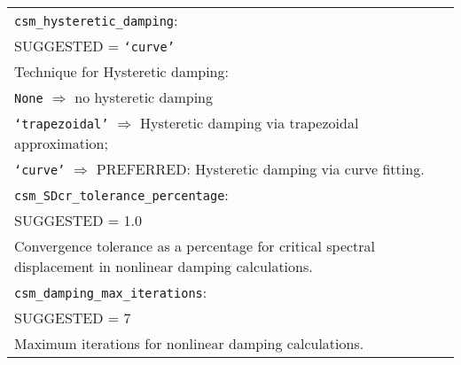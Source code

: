 \documentclass[a4paper, 12pt]{report}
\begin{document}
\begin{tabular}{|p{\textwidth}|}
\hline \vspace{0.1em} \texttt{csm\_hysteretic\_damping}: \\
SUGGESTED = \texttt{`curve'} \\
Technique for Hysteretic  damping: \\
 \hspace{0.5em} \texttt{None} $\Rightarrow$ no hysteretic  damping \\
 \hspace{0.5em} \texttt{`trapezoidal'} $\Rightarrow$ Hysteretic  damping via trapezoidal approximation; \\
 \hspace{0.5em} \texttt{`curve'} $\Rightarrow$ \small{PREFERRED}: Hysteretic  damping via curve fitting. \\
\hline \vspace{0.1em} \texttt{csm\_SDcr\_tolerance\_percentage}: \\
SUGGESTED = 1.0 \\
Convergence tolerance as a percentage for critical spectral
displacement in nonlinear damping calculations. \\
\hline \vspace{0.1em} \texttt{csm\_damping\_max\_iterations}: \\
SUGGESTED = 7 \\
 Maximum iterations for nonlinear damping calculations.\\
 \hline
 \end{tabular}
\end{document}
